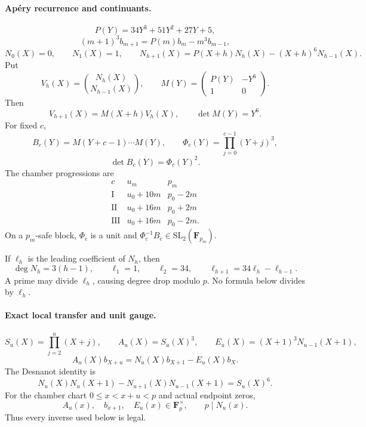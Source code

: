 \documentclass{article}
\begin{document}
\paragraph{Ap\'ery recurrence and continuants.}
\[
 P(Y)=34Y^3+51Y^2+27Y+5,
\]
\[
 (m+1)^3b_{m+1}=P(m)b_m-m^3b_{m-1},
\]
\[
 N_0(X)=0,\qquad N_1(X)=1,\qquad
 N_{h+1}(X)=P(X+h)N_h(X)-(X+h)^6N_{h-1}(X).
\]
Put
\[
 V_h(X)=\binom{N_h(X)}{N_{h-1}(X)},\qquad
 M(Y)=\begin{pmatrix}P(Y)&-Y^6\\1&0\end{pmatrix}.
\]
Then
\[
 V_{h+1}(X)=M(X+h)V_h(X),\qquad \det M(Y)=Y^6.
\]
For fixed $c$,
\[
 B_c(Y)=M(Y+c-1)\cdots M(Y),\qquad
 \Phi_c(Y)=\prod_{j=0}^{c-1}(Y+j)^3,
\]
\[
 \det B_c(Y)=\Phi_c(Y)^2.
\]
The chamber progressions are
\[
\begin{array}{c|c|c}
 c & u_m & p_m\\ \hline
 \mathrm I & u_0+10m & p_0-2m\\
 \mathrm {II} & u_0+16m & p_0+2m\\
 \mathrm {III} & u_0+16m & p_0-2m.
\end{array}
\]
On a $p_m$-safe block, $\Phi_c$ is a unit and
$\Phi_c^{-1}B_c\in\mathrm{SL}_2(\mathbf F_{p_m})$.

If $\ell_h$ is the leading coefficient of $N_h$, then
\[
 \deg N_h=3(h-1),\qquad
 \ell_1=1,\qquad \ell_2=34,\qquad
 \ell_{h+1}=34\ell_h-\ell_{h-1}.
\]
A prime may divide $\ell_h$, causing degree drop modulo $p$.
No formula below divides by $\ell_h$.

\paragraph{Exact local transfer and unit gauge.}
\[
 S_u(X)=\prod_{j=2}^{u}(X+j),\qquad
 A_u(X)=S_u(X)^3,\qquad
 E_u(X)=(X+1)^3N_{u-1}(X+1),
\]
\[
 \boxed{A_u(X)b_{X+u}=N_u(X)b_{X+1}-E_u(X)b_X.}
\]
The Desnanot identity is
\[
 \boxed{N_u(X)N_u(X+1)-N_{u+1}(X)N_{u-1}(X+1)=S_u(X)^6.}
\]
For the chamber chart $0\le x<x+u<p$ and actual endpoint zeros,
\[
 A_u(x),\quad b_{x+1},\quad E_u(x)\in\mathbf F_p^\times,
 \qquad p\mid N_u(x).
\]
Thus every inverse used below is legal.
\end{document}
